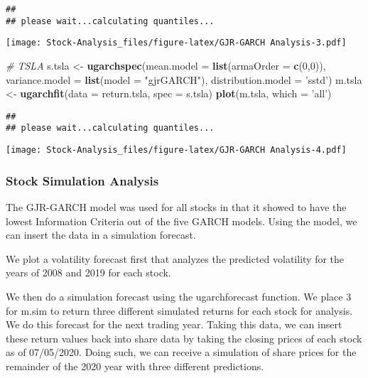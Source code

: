 \documentclass[
]{article}
\newenvironment{Shaded}{\begin{snugshade}}{\end{snugshade}}
\newcommand{\CommentTok}[1]{\textcolor[rgb]{0.56,0.35,0.01}{\textit{#1}}}
\newcommand{\DataTypeTok}[1]{\textcolor[rgb]{0.13,0.29,0.53}{#1}}
\newcommand{\DecValTok}[1]{\textcolor[rgb]{0.00,0.00,0.81}{#1}}
\newcommand{\KeywordTok}[1]{\textcolor[rgb]{0.13,0.29,0.53}{\textbf{#1}}}
\newcommand{\NormalTok}[1]{#1}
\newcommand{\StringTok}[1]{\textcolor[rgb]{0.31,0.60,0.02}{#1}}
\begin{document}
\begin{verbatim}
## 
## please wait...calculating quantiles...
\end{verbatim}

\texttt{[image: Stock-Analysis\_files/figure-latex/GJR-GARCH Analysis-3.pdf]}

\begin{Shaded}
\begin{Highlighting}[]
\CommentTok{# TSLA }
\NormalTok{s.tsla <-}\StringTok{ }\KeywordTok{ugarchspec}\NormalTok{(}\DataTypeTok{mean.model =} \KeywordTok{list}\NormalTok{(}\DataTypeTok{armaOrder =} \KeywordTok{c}\NormalTok{(}\DecValTok{0}\NormalTok{,}\DecValTok{0}\NormalTok{)),}
                \DataTypeTok{variance.model =} \KeywordTok{list}\NormalTok{(}\DataTypeTok{model =} \StringTok{"gjrGARCH"}\NormalTok{),}
                \DataTypeTok{distribution.model =} \StringTok{'sstd'}\NormalTok{)}
\NormalTok{m.tsla <-}\StringTok{ }\KeywordTok{ugarchfit}\NormalTok{(}\DataTypeTok{data =}\NormalTok{ return.tsla, }\DataTypeTok{spec =}\NormalTok{ s.tsla)}
\KeywordTok{plot}\NormalTok{(m.tsla, }\DataTypeTok{which =} \StringTok{'all'}\NormalTok{)}
\end{Highlighting}
\end{Shaded}

\begin{verbatim}
## 
## please wait...calculating quantiles...
\end{verbatim}

\texttt{[image: Stock-Analysis\_files/figure-latex/GJR-GARCH Analysis-4.pdf]}

\hypertarget{stock-simulation-analysis}{%
\subsubsection{Stock Simulation
Analysis}\label{stock-simulation-analysis}}

The GJR-GARCH model was used for all stocks in that it showed to have
the lowest Information Criteria out of the five GARCH models. Using the
model, we can insert the data in a simulation forecast.

We plot a volatility forecast first that analyzes the predicted
volatility for the years of 2008 and 2019 for each stock.

We then do a simulation forecast using the ugarchforecast function. We
place 3 for m.sim to return three different simulated returns for each
stock for analysis. We do this forecast for the next trading year.
Taking this data, we can insert these return values back into share data
by taking the closing prices of each stock as of 07/05/2020. Doing such,
we can receive a simulation of share prices for the remainder of the
2020 year with three different predictions.
\end{document}
